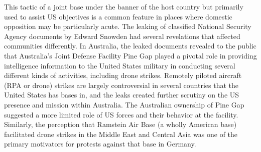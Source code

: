 This tactic of a joint base under the banner of the host country but primarily used to assist US objectives is a common feature in places where domestic opposition may be particularly acute. The leaking of classified National Security Agency documents by Edward Snowden had several revelations that affected communities differently. In Australia, the leaked documents revealed to the public that Australia's Joint Defense Facility Pine Gap played a pivotal role in providing intelligence information to the United States military in conducting several different kinds of activities, including drone strikes.\autocite{Cronau2017} Remotely piloted aircraft (RPA or drone) strikes are largely controversial in several countries that the United States has bases in, and the leaks created further scrutiny on the US presence and mission within Australia. The Australian ownership of Pine Gap suggested a more limited role of US forces and their behavior at the facility. Similarly, the perception that Ramstein Air Base (a wholly American base) facilitated drone strikes in the Middle East and Central Asia was one of the primary motivators for protests against that base in Germany.\autocite{berlinone20190723}


